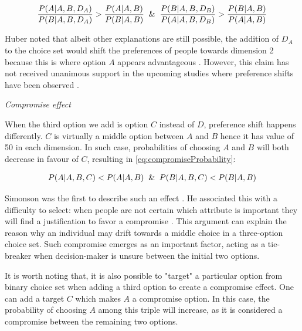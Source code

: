 \documentclass[a4paper,12pt]{article}
\newcommand{\citeyearonly}[1]{\citeyearpar{#1}}
\begin{document}
\begin{equation}\label{eq:attractionProbability}
    \frac{P(A|A,B,D_A)}{P(B|A,B,D_A)} > \frac{P(A|A,B)}{P(B|A,B)} \And \frac{P(B|A,B,D_B)}{P(A|A,B,D_B)} > \frac{P(B|A,B)}{P(A|A,B)}
\end{equation}

Huber noted that albeit other explanations are still possible, the addition of $D_A$ to the choice set would shift the preferences of people towards dimension 2 because this is where option $A$ appears advantageous \cite{huberEtAl82, bhatia2013associations}. However, this claim has not received unanimous support in the upcoming studies where preference shifts have been observed \citep{wedell1991distinguishing}.

\textit{Compromise effect}

When the third option we add is option $C$ instead of $D$, preference shift happens differently. $C$ is virtually a middle option between $A$ and $B$ hence it has value of 50 in each dimension. In such case, probabilities of choosing $A$ and $B$ will both decrease in favour of $C$, resulting in \ref{eq:compromiseProbability}:

\begin{align}\label{eq:compromiseProbability}
    P(A|A,B,C) < P(A|A,B) \And P(B|A,B,C) < P(B|A,B)
\end{align}

Simonson was the first to describe such an effect \citeyearonly{simonson89}. He associated this with a difficulty to select: when people are not certain which attribute is important they will find a justification to favor a compromise \citep{simonson89}. This argument can explain the reason why an individual may drift towards a middle choice in a three-option choice set. Such compromise emerges as an important factor, acting as a tie-breaker when decision-maker is unsure between the initial two options. 

It is worth noting that, it is also possible to "target" a particular option from binary choice set when adding a third option to create a compromise effect. One can add a target $C$ which makes $A$ a compromise option. In this case, the probability of choosing $A$ among this triple will increase, as it is considered a compromise between the remaining two options. 
\end{document}
